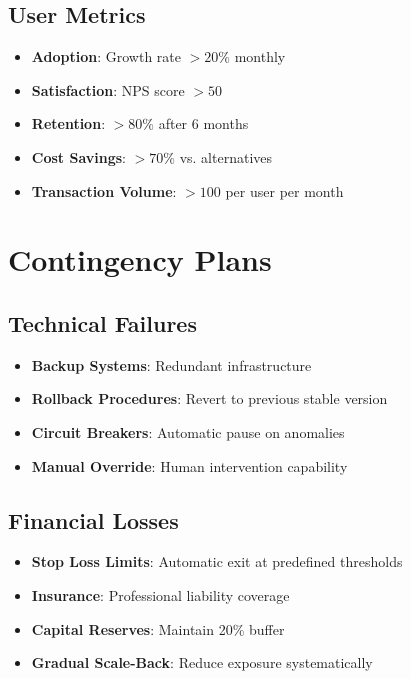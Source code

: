 \documentclass[12pt]{article}
\begin{document}
\subsection{User Metrics}

\begin{itemize}
    \item \textbf{Adoption}: Growth rate $> 20\%$ monthly
    \item \textbf{Satisfaction}: NPS score $> 50$
    \item \textbf{Retention}: $> 80\%$ after 6 months
    \item \textbf{Cost Savings}: $> 70\%$ vs. alternatives
    \item \textbf{Transaction Volume}: $> 100$ per user per month
\end{itemize}

\section{Contingency Plans}

\subsection{Technical Failures}

\begin{itemize}
    \item \textbf{Backup Systems}: Redundant infrastructure
    \item \textbf{Rollback Procedures}: Revert to previous stable version
    \item \textbf{Circuit Breakers}: Automatic pause on anomalies
    \item \textbf{Manual Override}: Human intervention capability
\end{itemize}

\subsection{Financial Losses}

\begin{itemize}
    \item \textbf{Stop Loss Limits}: Automatic exit at predefined thresholds
    \item \textbf{Insurance}: Professional liability coverage
    \item \textbf{Capital Reserves}: Maintain 20\% buffer
    \item \textbf{Gradual Scale-Back}: Reduce exposure systematically
\end{itemize}
\end{document}
